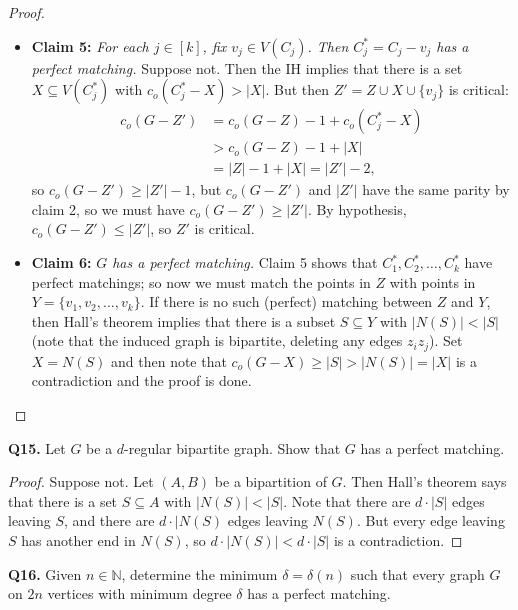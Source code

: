 \begin{proof}
\begin{itemize}[nolistsep]
	\item \textbf{Claim 5:} \emph{For each \( j \in [k] \), fix \( v_{j} \in V(C_{j}) \). Then \(C_{j}^{\ast} = C_{j} - v_{j}  \) has a perfect matching.} Suppose not. Then the IH implies that there is a set \( X \subseteq V(C^{\ast} _{j}) \) with \( c_{o} (C^{\ast} _{j} - X) > |X| \). But then \( Z' = Z \cup X \cup \{ v_{j}  \}  \) is critical:
		\begin{align*}
			c_{o} (G - Z') &= c_{o} (G - Z) - 1 + c_{o} (C^{\ast} _{j}  - X  ) \\
				       &> c_{o}(G - Z)  - 1 + |X| \\
				       &= |Z| - 1 + |X| = |Z'| - 2,
		\end{align*}
		so \( c_{o} (G - Z') \geq |Z'| - 1 \), but \( c_{o} (G - Z') \) and \( |Z'| \) have the same parity by claim 2, so we must have \( c_{o} (G - Z') \geq |Z'| \). By hypothesis, \( c_{o} (G - Z') \leq |Z'| \), so \( Z' \) is critical.
	\item \textbf{Claim 6:} \emph{\( G \) has a perfect matching.} Claim 5 shows that \( C^{\ast} _1, C^{\ast} _2, \hdots , C^{\ast} _{k}  \) have perfect matchings; so now we must match the points in \( Z \) with points in \(Y = \{ v_1, v_2, \hdots , v_{k}  \}  \). If there is no such (perfect) matching between \( Z \) and \( Y \), then Hall's theorem implies that there is a subset \( S \subseteq Y \) with \( |N(S)| < |S| \) (note that the induced graph is bipartite, deleting any edges \( z_{i} z_{j}  \)). Set \( X = N(S) \) and then note that \( c_{o} (G - X) \geq |S| > |N(S)| = |X| \) is a contradiction and the proof is done. \qedhere
\end{itemize}
\end{proof}
\noindent \textbf{Q15.} Let \( G \) be a \( d \)-regular bipartite graph. Show that \( G \) has a perfect matching.
\begin{proof}
Suppose not. Let \( (A,B) \) be a bipartition of \( G \). Then Hall's theorem says that there is a set \( S \subseteq A \) with \( |N(S)| < |S| \). Note that there are \( d \cdot |S| \) edges leaving \( S \), and there are \( d \cdot |N(S) \) edges leaving \( N(S) \). But every edge leaving \( S \) has another end in \( N(S) \), so \( d \cdot |N(S)| < d \cdot |S| \) is a contradiction.
\end{proof}
\noindent \textbf{Q16.} Given \( n \in \mathbb{N}  \), determine the minimum \( \delta = \delta (n) \) such that every graph \( G \) on \( 2n \) vertices with minimum degree \( \delta  \) has a perfect matching.
